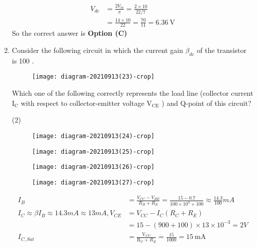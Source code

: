 \begin{enumerate}
\begin{answer}
\begin{align*}
V_{d c}&=\frac{2 V_{m}}{\pi}=\frac{2 \times 10}{22 / 7}\\&=\frac{14 \times 10}{22}=\frac{70}{11}=6.36 \mathrm{~V}
\end{align*}
So the correct answer is \textbf{Option (C)}
\end{answer}
	\item Consider the following circuit in which the current gain $\beta_{d c}$ of the transistor is 100 .\\
	\begin{figure}[H]
		\centering
		\texttt{[image: diagram-20210913(23)-crop]}
	\end{figure}
	Which one of the following correctly represents the load line (collector current $\mathrm{I}_{\mathrm{C}}$ with respect to collector-emitter voltage $\mathrm{V}_{\mathrm{CE}}$ ) and Q-point of this circuit?
{	}
\begin{tasks}(2)
\task[\textbf{A.}]\begin{figure}[H]
	\centering
	\texttt{[image: diagram-20210913(24)-crop]}
\end{figure}
\task[\textbf{B.}] \begin{figure}[H]
	\centering
	\texttt{[image: diagram-20210913(25)-crop]}
\end{figure}
\task[\textbf{C.}] \begin{figure}[H]
	\centering
	\texttt{[image: diagram-20210913(26)-crop]}
\end{figure}
\task[\textbf{D.}] \begin{figure}[H]
	\centering
	\texttt{[image: diagram-20210913(27)-crop]}
\end{figure}
\end{tasks}
\begin{answer}
\begin{align*}
I_{B}&=\frac{V_{C C}-V_{B E}}{R_{B}+R_{E}}=\frac{15-0.7}{100 \times 10^{3}+100} \approx \frac{14.3}{100} m A\\
I_{C} \approx \beta I_{B} \approx 14.3 m A \approx 13 m A, V_{C E}&=V_{C C}-I_{C}\left(R_{C}+R_{E}\right)\\&=15-(900+100) \times 13 \times 10^{-3}=2 V\\
I_{C, S a t}&=\frac{\mathrm{V}_{\mathrm{CC}}}{\mathrm{R}_{\mathrm{C}}+R_{E}}=\frac{15}{1000}=15 \mathrm{~mA}
\end{align*}

\end{answer}
\end{enumerate}
